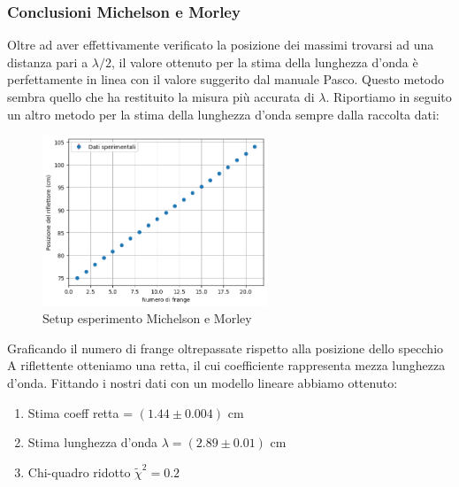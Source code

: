 \documentclass[letterpaper,12pt]{article}
\begin{document}
\subsubsection{Conclusioni Michelson e Morley}
Oltre ad aver effettivamente verificato la posizione dei massimi trovarsi ad una distanza pari a $\lambda/2$, 
il valore ottenuto per la stima della lunghezza d'onda è perfettamente in linea con il valore suggerito dal manuale Pasco.
Questo metodo sembra quello che ha restituito la misura più accurata di $\lambda$. Riportiamo in seguito un altro metodo per la stima 
della lunghezza d'onda sempre dalla raccolta dati:
\begin{figure}[h!]
	\centering
	\includegraphics[width = 0.6\textwidth]{MichelsonGrafico.png}
	\caption{Setup esperimento Michelson e Morley}
	\label{fig:GraficoBragg}
\end{figure}

Graficando il numero di frange oltrepassate rispetto alla posizione dello specchio A riflettente otteniamo una retta,
il cui coefficiente rappresenta mezza lunghezza d'onda. Fittando i nostri dati con un modello lineare abbiamo ottenuto:
\begin{enumerate}
	\item Stima coeff retta = $(1.44\pm0.004)$ cm
	\item Stima lunghezza d'onda $ \lambda = (2.89\pm0.01)$ cm
	\item Chi-quadro ridotto $\widetilde{\chi}^2 = 0.2$
\end{enumerate}

\newpage
\end{document}

